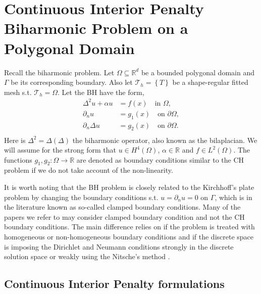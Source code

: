 
\newpage
\section{Continuous Interior Penalty Biharmonic Problem on a Polygonal Domain}%
\label{sec:CIP_biharmonic_problem}

Recall the biharmonic problem.
Let $\Omega \subseteq    \mathbb{R} ^d$ be a bounded polygonal domain and $\Gamma $ be its corresponding boundary. Also let $\mathcal{T}_{h} = \left\{ T \right\} $ be a shape-regular fitted mesh s.t. $\mathcal{T}_{h} = \Omega $. Let the BH have the form,
\begin{equation}
\label{eq:bi_problem}
\begin{split}
    \Delta^2  u  + \alpha  u  & = f( x)  \quad \text{in } \Omega,   \\
    \partial _{n} u & = g_{1}(x)   \quad \text{on } \partial \Omega,  \\
    \partial _{n} \Delta  u & = g_{2}( x)   \quad \text{on } \partial \Omega .  \\
\end{split}
\end{equation}
Here is $\Delta ^2 = \Delta  \left( \Delta  \right) $ the biharmonic operator, also known as the bilaplacian. We will assume for the strong form that $u \in H^{4}\left( \Omega  \right) $, $\alpha  \in  \mathbb{R} $ and $f \in L^{2}\left( \Omega  \right)
$. The functions $g_{1},g_{2}: \Omega  \to \mathbb{R}$ are denoted as boundary conditions similar to the CH problem if we do not take account of the non-linearity.

\begin{remark}
It is worth noting that the BH problem is closely related to the Kirchhoff's plate problem by changing the boundary conditions s.t. $u = \partial _{n } u = 0$ on $\Gamma $, which is in the literature known as so-called clamped boundary conditions.
Many of the papers we refer to may consider clamped boundary condition and not the CH boundary conditions. The main difference relies on if the problem is treated with homogeneous or non-homogeneous boundary conditions and if the discrete space is
imposing the Dirichlet and Neumann conditions strongly in the discrete solution space or weakly using the Nitsche's method \cite{nitsche1971variationsprinzip}.
\end{remark}


\subsection{Continuous Interior Penalty formulations}%
\label{sub:continuous_interior_penalty_formulations}

